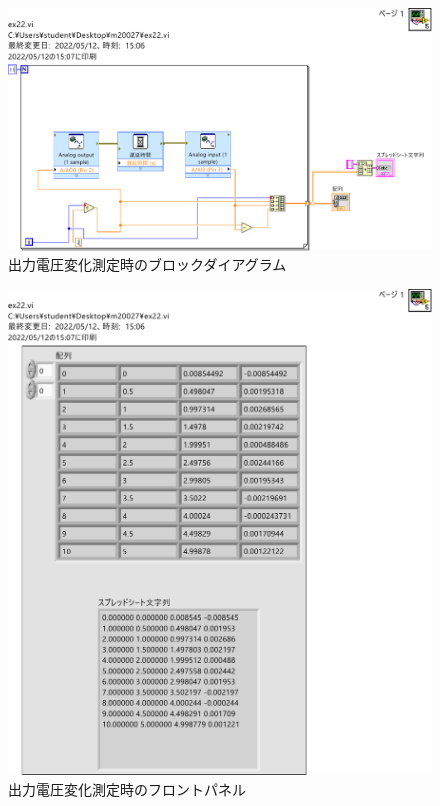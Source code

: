 \begin{figure}[h]
\centering
\includegraphics[scale=0.5]{./fig/ex22-block.pdf}\\
\useMycounter[\label{ex22-block}]出力電圧変化測定時のブロックダイアグラム
\end{figure}
\begin{figure}[h]
\centering
\includegraphics[scale=0.5]{./fig/ex22-flont.pdf}
\caption{出力電圧変化測定時のフロントパネル}
\label{fig:ex22-flont}
\end{figure}

